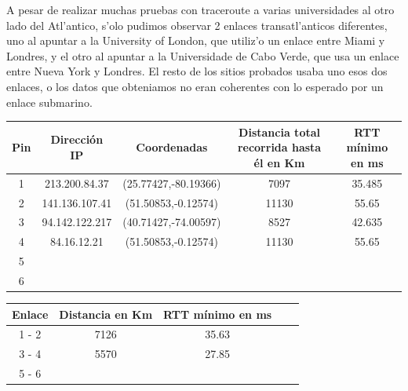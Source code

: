 A pesar de realizar muchas pruebas con traceroute a varias universidades al otro lado del Atl'antico, s'olo pudimos observar 2 enlaces transatl'anticos diferentes, uno al apuntar a la University of London, que utiliz'o un enlace entre Miami y Londres, y el otro al apuntar a la Universidade de Cabo Verde, que usa un enlace entre Nueva York y Londres. El resto de los sitios probados usaba uno esos dos enlaces, o los datos que obteniamos no eran coherentes con lo esperado por un enlace submarino.

\noindent \begin{center} \begin{tabular}{| c | c | c | c | c |} \hline 
Pin 	& 	 Dirección IP 	 & 	 Coordenadas 		 & 	 Distancia total recorrida hasta él en Km 	 & 	 RTT mínimo en ms 	\\ \hline 
1 	 	& 	213.200.84.37  & (25.77427,-80.19366)	 & 	 			7097			 & 	 	 	35.485			\\ \hline 
2 		& 	141.136.107.41 & (51.50853,-0.12574)	 & 	 			11130			 & 	 		55.65			\\ \hline 
3 	 	& 	94.142.122.217 & (40.71427,-74.00597)	 & 	  		8527			 & 	 		42.635			\\ \hline 
4 	 	& 	84.16.12.21		 & (51.50853,-0.12574)	 & 	  		11130			 & 	  	55.65				\\ \hline 
5 	 	& 	  				 & 	  					 & 	  											 & 	  					\\ \hline 
6 	 	& 	  				 & 	 				 	 & 	  											 & 	  					\\ \hline 
\end{tabular} \end{center}

\noindent \begin{center} \begin{tabular}{| c | c | c | c | c |} \hline 
Enlace 	 &	Distancia en Km 	& 	RTT mínimo en ms	\\ \hline 
1 - 2	 &			7126 	 		& 		35.63			\\ \hline 
3 - 4 	 & 		5570 			&   	27.85			\\ \hline 
5 - 6 	 & 			 			&						\\ \hline 
\end{tabular} \end{center}

